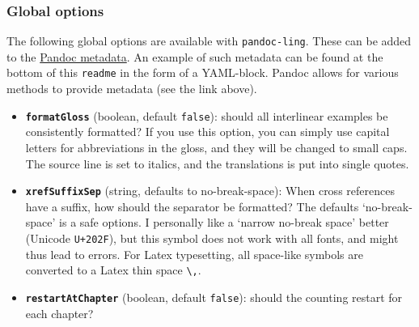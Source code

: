 \documentclass[
]{article}
\providecommand{\tightlist}{%
  \setlength{\itemsep}{0pt}\setlength{\parskip}{0pt}}
\begin{document}
\hypertarget{global-options}{%
\subsubsection{Global options}\label{global-options}}

The following global options are available with \texttt{pandoc-ling}.
These can be added to the
\href{https://pandoc.org/MANUAL.html\#metadata-blocks}{Pandoc metadata}.
An example of such metadata can be found at the bottom of this
\texttt{readme} in the form of a YAML-block. Pandoc allows for various
methods to provide metadata (see the link above).

\begin{itemize}
\tightlist
\item
  \textbf{\texttt{formatGloss}} (boolean, default \texttt{false}):
  should all interlinear examples be consistently formatted? If you use
  this option, you can simply use capital letters for abbreviations in
  the gloss, and they will be changed to small caps. The source line is
  set to italics, and the translations is put into single quotes.
\item
  \textbf{\texttt{xrefSuffixSep}} (string, defaults to no-break-space):
  When cross references have a suffix, how should the separator be
  formatted? The defaults `no-break-space' is a safe options. I
  personally like a `narrow no-break space' better (Unicode
  \texttt{U+202F}), but this symbol does not work with all fonts, and
  might thus lead to errors. For Latex typesetting, all space-like
  symbols are converted to a Latex thin space
  \texttt{\textbackslash{},}.
\item
  \textbf{\texttt{restartAtChapter}} (boolean, default \texttt{false}):
  should the counting restart for each chapter?


\end{itemize}
\end{document}

